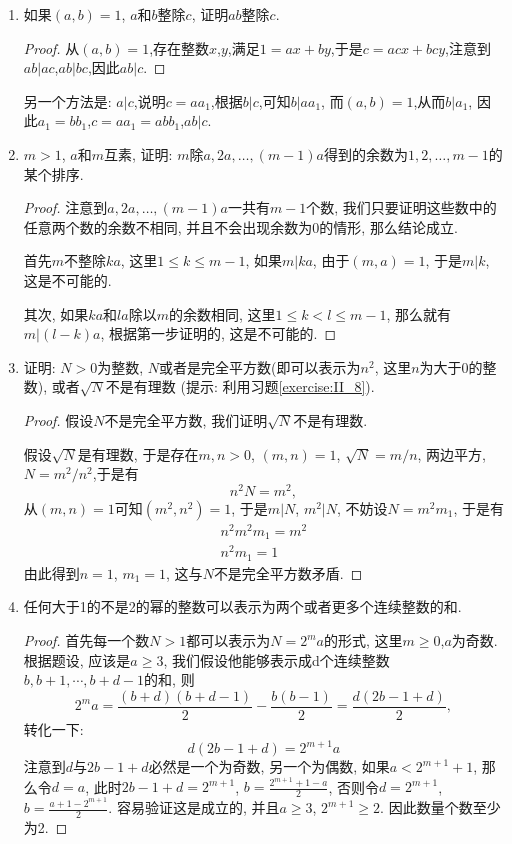 \documentclass[12pt,a4paper]{book} %
\theoremstyle{remark}
\theoremstyle{example}
\theoremstyle{lemma}
\theoremstyle{corollary}
\numberwithin{theorem}{chapter}
\begin{document}
\begin{enumerate}
\item \label{exercise:III_1} 如果$(a, b) = 1$, $a$和$b$整除$c$, 证明$ab$整除$c$.

\begin{proof}
从$(a, b) = 1$,存在整数$x$,$y$,满足$1 = ax + by$,于是$c = acx + bcy$,注意到$ab | ac$,$ab | bc$,因此$ab | c$.
\end{proof}

另一个方法是: $a | c$,说明$c = aa_1$,根据$b | c$,可知$b|aa_1$, 而$(a,b)=1$,从而$b|a_1$, 因此$a_1=bb_1$,$c=aa_1=abb_1$,$ab|c$.

\item \label{exercise:III_2} $m > 1$, $a$和$m$互素, 证明: $m$除$a, 2a, \ldots, (m - 1)a$得到的余数为$1, 2, \ldots, m - 1$的某个排序.

\begin{proof}
注意到$a, 2a, \ldots, (m-1)a$一共有$m-1$个数, 我们只要证明这些数中的任意两个数的余数不相同, 并且不会出现余数为0的情形, 那么结论成立.

首先$m$不整除$ka$, 这里$1 \le k \le m-1$, 如果$m | ka$, 由于$(m, a) = 1$, 于是$m|k$, 这是不可能的.

其次, 如果$ka$和$la$除以$m$的余数相同, 这里$1 \le k < l \le m-1$, 那么就有$m | (l-k)a$, 根据第一步证明的, 这是不可能的.
\end{proof}

\item \label{exercise:III_3} 证明: $N > 0$为整数,  $N$或者是完全平方数(即可以表示为$n^2$, 这里$n$为大于0的整数), 或者$\sqrt{N}$不是有理数 (提示: 利用习题\ref{exercise:II_8}).

\begin{proof}
假设$N$不是完全平方数, 我们证明$\sqrt{N}$不是有理数.

假设$\sqrt{N}$是有理数, 于是存在$m, n > 0$, $(m, n) = 1$, $\sqrt{N} = m/n$, 两边平方, $N = m^2/n^2$,于是有
\[
n^2N = m^2,
\]
从$(m, n) = 1$可知$(m^2, n^2) = 1$, 于是$m|N$, $m^2|N$, 不妨设$N=m^2m_1$, 于是有
\begin{gather*}
n^2m^2m_1 = m^2 \\
n^2m_1 = 1
\end{gather*}
由此得到$n=1$, $m_1 = 1$, 这与$N$不是完全平方数矛盾. 
\end{proof}

\item \label{exercise:III_4} 任何大于1的不是2的幂的整数可以表示为两个或者更多个连续整数的和.

\begin{proof}
首先每一个数$N > 1$都可以表示为$N = 2^ma$的形式, 这里$m \ge 0$,$a$为奇数. 根据题设, 应该是$a \ge 3$, 我们假设他能够表示成d个连续整数$b, b+1, \cdots, b + d - 1$的和, 则
\[
2^ma = \frac{(b+d)(b+d-1)}{2} - \frac{b(b-1)}{2} = \frac{d(2b-1+d)}{2},
\]
转化一下:
\[
d(2b-1 + d) = 2^{m+1}a
\]
注意到$d$与$2b-1+d$必然是一个为奇数, 另一个为偶数, 如果$a < 2^{m+1} + 1$, 那么令$d = a$, 此时$2b-1+d = 2^{m+1}$, $b = \frac{2^{m+1}+1-a}{2}$, 否则令$d = 2^{m+1}$, $b = \frac{a + 1 - 2^{m+1}}{2}$. 容易验证这是成立的, 并且$a \ge 3$, $2^{m+1} \ge 2$. 因此数量个数至少为2.
\end{proof}


\end{enumerate}
\end{document}
